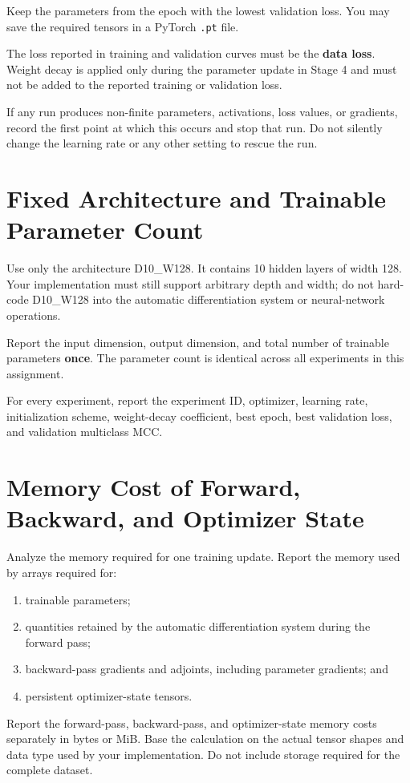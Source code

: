\documentclass[11pt]{article}
\begin{document}
Keep the parameters from the epoch with the lowest validation loss. You may save the required tensors in a PyTorch \texttt{.pt} file.

The loss reported in training and validation curves must be the \textbf{data loss}. Weight decay is applied only during the parameter update in Stage 4 and must not be added to the reported training or validation loss.

If any run produces non-finite parameters, activations, loss values, or gradients, record the first point at which this occurs and stop that run. Do not silently change the learning rate or any other setting to rescue the run.

\section{Fixed Architecture and Trainable Parameter Count}
Use only the architecture D10\_W128. It contains 10 hidden layers of width 128. Your implementation must still support arbitrary depth and width; do not hard-code D10\_W128 into the automatic differentiation system or neural-network operations.

Report the input dimension, output dimension, and total number of trainable parameters \textbf{once}. The parameter count is identical across all experiments in this assignment.

For every experiment, report the experiment ID, optimizer, learning rate, initialization scheme, weight-decay coefficient, best epoch, best validation loss, and validation multiclass MCC.

\section{Memory Cost of Forward, Backward, and Optimizer State}
Analyze the memory required for one training update. Report the memory used by arrays required for:
\begin{enumerate}
    \item trainable parameters;
    \item quantities retained by the automatic differentiation system during the forward pass;
    \item backward-pass gradients and adjoints, including parameter gradients; and
    \item persistent optimizer-state tensors.
\end{enumerate}

Report the forward-pass, backward-pass, and optimizer-state memory costs separately in bytes or MiB. Base the calculation on the actual tensor shapes and data type used by your implementation. Do not include storage required for the complete dataset.
\end{document}
